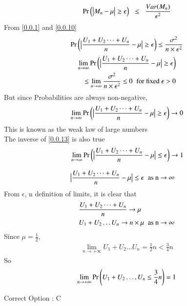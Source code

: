 \documentclass[journal,12pt,twocolumn]{IEEEtran}
\begin{document}
\begin{align}
    \Pr\left(\big\vert M_n-\mu\big\vert\geq \epsilon\right) \hspace{0.2cm} \leq \hspace{0.2cm} \frac{Var(M_n)}{\epsilon^2}
\end{align}
From \eqref{0.0.1} and \eqref{0.0.10}
\begin{align}
    \Pr\left(\big\vert\frac{U_1+U_2\dots+U_n}{n} - \mu\big\vert \geq \epsilon\right) \leq \frac{\sigma^2}{n\times\epsilon^2}\notag
\end{align}
\begin{align}
    \begin{split}
    \lim_{n \to \infty} \Pr\left(\big\vert\frac{U_1+U_2\dots+U_n}{n} - \mu\big\vert \geq \epsilon\right)\\
    \leq \lim_{n \to \infty} \frac{\sigma^2}{n\times\epsilon^2} \leq 0 \hspace{0.2cm} \text{for fixed $\epsilon > 0$}
    \end{split}
\end{align}
But since Probabilities are always non-negative,
\begin{align}
    \lim_{n \to \infty} \Pr\left(\big\vert\frac{U_1+U_2\dots+U_n}{n} - \mu\big\vert \geq \epsilon\right) \to 0 \label{0.0.13}
\end{align}
This is known as the weak law of large numbers\\
The inverse of \eqref{0.0.13} is also true
\begin{align}
    &\lim_{n \to \infty} \Pr\left(\big\vert\frac{U_1+U_2\dots+U_n}{n} - \mu\big\vert \leq \epsilon\right) \to 1 \\[0.3cm]
    &\big\vert\frac{U_1+U_2\dots+U_n}{n} - \mu\big\vert \leq \epsilon \hspace{0.2cm}\text{as  n $\to$ $\infty$} 
\end{align}
From $\epsilon$, n definition of limits, it is clear that 
\begin{align}
    &\frac{U_1+U_2\dots+U_n}{n} \to \mu\\
    &U_1+U_2\dots U_n \to n\times\mu \hspace{0.2cm}\text{as  n $\to$ $\infty$}
\end{align}
Since $\mu = \frac{1}{2}$,
\begin{align}
    \lim_{n \to +\infty} U_1+U_2\dots U_n = \frac{1}{2}n < \frac{3}{4}n
\end{align}
So 
\begin{align}
    \lim_{n \to +\infty} \Pr\left(U_1+U_2\dots,U_n\leq \frac{3}{4}n\right) = 1
\end{align}
\begin{center}
    Correct Option : C
\end{center}
\end{document}
